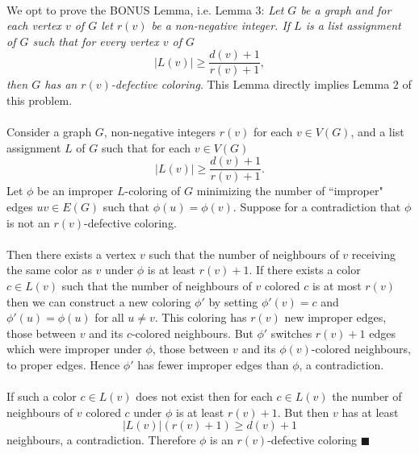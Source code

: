 \documentclass[letterpaper,12pt,oneside,onecolumn]{article}
\begin{document}
\paragraph{}
We opt to prove the BONUS Lemma, i.e. Lemma $3$:
\textit{Let $G$ be a graph and for each vertex $v$ of $G$ let $r(v)$ be a non-negative integer. If $L$ is a list assignment of $G$ such that for every vertex $v$ of $G$
$$|L(v)| \geq \frac{d(v) + 1}{r(v)+1},$$
then $G$ has an $r(v)$-defective coloring}. This Lemma directly implies Lemma $2$ of this problem.
\paragraph{}
Consider a graph $G$, non-negative integers $r(v)$ for each $v \in V(G)$, and a list assignment $L$ of $G$ such that for each $v \in V(G)$
$$|L(v)| \geq \frac{d(v) + 1}{r(v)+1}.$$
Let $\phi$ be an improper $L$-coloring of $G$ minimizing the number of ``improper" edges $uv \in E(G)$ such that $\phi(u) = \phi(v)$. Suppose for a contradiction that $\phi$ is not an $r(v)$-defective coloring.
\paragraph{}
Then there exists a vertex $v$ such that the number of neighbours of $v$ receiving the same color as $v$ under $\phi$ is at least $r(v) + 1$. If there exists a color $c \in L(v)$ such that the number of neighbours of $v$ colored $c$ is at most $r(v)$ then we can construct a new coloring $\phi'$ by setting $\phi'(v) = c$ and $\phi'(u) = \phi(u)$ for all $u \neq v$. This coloring has $r(v)$ new improper edges, those between $v$ and its $c$-colored neighbours. But $\phi'$ switches $r(v) + 1$ edges which were improper under $\phi$, those between $v$ and its $\phi(v)$-colored neighbours, to proper edges. Hence $\phi'$ has fewer improper edges than $\phi$, a contradiction.
\paragraph{}
If such a color $c \in L(v)$ does not exist then  for each $c \in L(v)$ the number of neighbours of $v$ colored $c$ under $\phi$ is at least $r(v) + 1$. But then $v$ has at least
$$|L(v)|(r(v) + 1) \geq d(v) + 1$$
neighbours, a contradiction. Therefore $\phi$ is an $r(v)$-defective coloring $\blacksquare$

\newpage
\section{}
\end{document}

